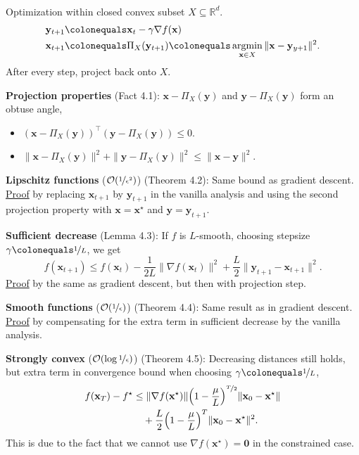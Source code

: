 \documentclass{article}
\DeclareMathOperator*{\argmin}{argmin}
\newcommand{\lft}{\mathopen{}\mathclose\bgroup\left}
\newcommand{\rgt}{\aftergroup\egroup\right}
\newcommand{\R}{\mathbb{R}}
\renewcommand{\vec}[1]{\mathbf{#1}}
\newcommand{\transpose}[1]{#1^\top}
\newenvironment{topic}[1]
{\textbf{\sffamily \colorbox{black}{\rlap{\textbf{\textcolor{white}{#1}}}\hspace{\linewidth}\hspace{-2\fboxsep}}} \\ \vspace{0.2cm}}
{}
\begin{document}
\begin{multicols*}{2}
    \begin{topic}{4 Projected gradient descent}
        Optimization within closed convex subset $X \subseteq \R^d$.
        \begin{align*}
            \vec{y}_{t+1} & \colonequals \vec{x}_t - \gamma \nabla f(\vec{x})                                                       \\
            \vec{x}_{t+1} & \colonequals \Pi_X(\vec{y}_{t+1}) \colonequals \argmin_{\vec{x} \in X} \| \vec{x} - \vec{y}_{y+1} \|^2.
        \end{align*}
        After every step, project back onto $X$.

        \textbf{Projection properties} (Fact 4.1): $\vec{x} - \Pi_X(\vec{y})$ and $\vec{y} - \Pi_X(\vec{y})$ form an obtuse angle,
        \begin{itemize}
            \item $\transpose{(\vec{x} - \Pi_X(\vec{y}))}(\vec{y} - \Pi_X(\vec{y})) \leq 0$.
            \item $\| \vec{x} - \Pi_X(\vec{y}) \|^2 + \| \vec{y} - \Pi_X(\vec{y}) \|^2 \leq \| \vec{x} - \vec{y} \|^2$.
        \end{itemize}

        \textbf{Lipschitz functions} ($\mathcal{O}(\nicefrac{1}{\epsilon^2})$) (Theorem 4.2): Same bound as gradient
        descent. \underline{Proof} by replacing $\vec{x}_{t+1}$ by $\vec{y}_{t+1}$ in the vanilla
        analysis and using the second projection property with $\vec{x} = \vec{x}^\star$ and
        $\vec{y} = \vec{y}_{t+1}$.

        \textbf{Sufficient decrease} (Lemma 4.3): If $f$ is $L$-smooth,
        choosing stepsize $\gamma \colonequals \nicefrac{1}{L}$, we get \[
            f(\vec{x}_{t+1}) \leq f(\vec{x}_t) - \frac{1}{2L} \| \nabla f(\vec{x}_t) \|^2 + \frac{L}{2} \| \vec{y}_{t+1} - \vec{x}_{t+1} \|^2.
        \]
        \underline{Proof} by the same as gradient descent, but then with projection step.

        \textbf{Smooth functions} ($\mathcal{O}(\nicefrac{1}{\epsilon})$) (Theorem 4.4): Same result
        as in gradient descent. \underline{Proof} by compensating for the extra term in sufficient
        decrease by the vanilla analysis.

        \textbf{Strongly convex} ($\mathcal{O}(\log \nicefrac{1}{\epsilon})$) (Theorem 4.5):
        Decreasing distances still holds, but extra term in convergence bound when choosing
        $\gamma \colonequals \nicefrac{1}{L}$,
        \begin{align*}
            f(\vec{x}_T) - f^\star & \leq \| \nabla f(\vec{x}^\star) \| \lft( 1 - \frac{\mu}{L} \rgt)^{\nicefrac{T}{2}} \| \vec{x}_0 - \vec{x}^\star \| \\
                                   & \quad + \frac{L}{2} \lft( 1 - \frac{\mu}{L} \rgt)^T \| \vec{x}_0 - \vec{x}^\star \|^2.
        \end{align*}
        This is due to the fact that we cannot use $\nabla f(\vec{x}^\star) = \vec{0}$ in the constrained
        case.
    \end{topic}


\end{multicols*}
\end{document}

